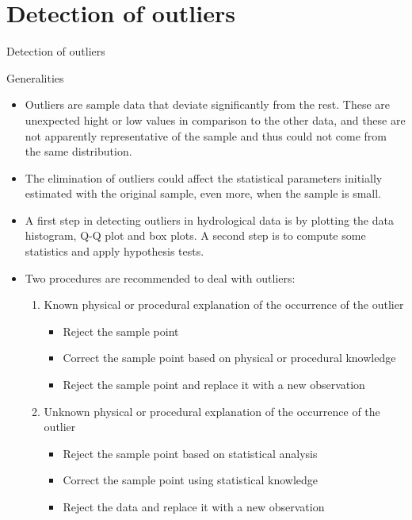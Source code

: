 \documentclass[8pt]{beamer}
\renewcommand{\emph}[1]{\textcolor{myorange}{#1}}
\begin{document}
\section{Detection of outliers}
\begin{frame}{Detection of outliers}

    \begin{block}{Generalities}
    \end{block}
        \begin{itemize}
            \item \emph{Outliers} are sample data that deviate significantly from the rest. These are \emph{unexpected hight or low values} in comparison to the other data, and these  are not apparently representative of the sample and thus could not come from the same distribution.  
            \item The elimination of outliers could affect the  \emph{statistical parameters} initially estimated with the original sample, even more, when the sample is small. 
            \item A first step in detecting  outliers in hydrological data is by plotting the data \emph{histogram}, \emph{Q-Q plot} and \emph{box plots}. A second step is to compute some \emph{statistics} and apply \emph{hypothesis tests}. 
            \item Two procedures are recommended to deal with \emph{outliers}:
                \begin{enumerate}
                    \item Known physical or procedural explanation of the occurrence of the outlier
                        \begin{itemize}
                            \item Reject the sample point 
                            \item Correct the sample point based on physical or procedural knowledge
                            \item Reject the sample point and replace it with a new observation
                        \end{itemize}
                    \item Unknown physical or procedural explanation of the occurrence of the outlier
                        \begin{itemize}
                            \item Reject the sample point based on statistical analysis
                            \item Correct the sample point using statistical knowledge 
                            \item Reject the data and replace it with a new observation
                        \end{itemize}
                \end{enumerate}


\end{itemize}
\end{frame}
\end{document}
